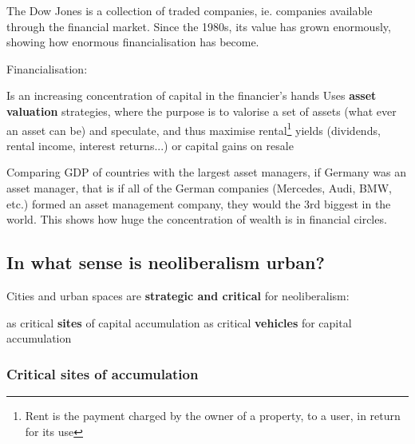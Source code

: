 \documentclass{article}
\begin{document}
The Dow Jones is a collection of traded companies, ie. companies available through the financial market. Since the 1980s, its value has grown enormously, showing how enormous financialisation has become.

Financialisation:

\begin{outline}
	\1 Is an increasing concentration of capital in the financier's hands
	\1 Uses \textbf{asset valuation} strategies, where the purpose is to valorise a set of assets (what ever an asset can be) and speculate, and thus maximise rental\footnote{Rent is the payment charged by the owner of a property, to a user, in return for its use} yields (dividends, rental income, interest returns...) or capital gains on resale
\end{outline}

Comparing GDP of countries with the largest asset managers, if Germany was an asset manager, that is if all of the German companies (Mercedes, Audi, BMW, etc.) formed an asset management company, they would the 3rd biggest in the world. This shows how huge the concentration of wealth is in financial circles. 

\subsection{In what sense is neoliberalism urban?}

Cities and urban spaces are \textbf{strategic and critical} for neoliberalism:

\begin{outline}
	\1 as critical \textbf{sites} of capital accumulation
	\1 as critical \textbf{vehicles} for capital accumulation
\end{outline}

\subsubsection{Critical sites of accumulation}
\end{document}
